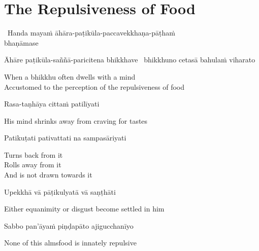 \suttaRef{[MN 2]}


\section{The Repulsiveness of Food}
\label{repulsiveness-of-food}

\begin{leader}
  \anglebracketleft\ \hspace{-0.5mm}Handa mayaṁ āhāra-paṭikūla-paccavekkhaṇa-pāṭhaṁ\\ bhaṇāmase \hspace{-0.5mm}\anglebracketright\
\end{leader}

\begin{pali-hang}
  Āhāre paṭikūla-saññā-paricitena bhikkhave \breathmark\ bhikkhuno cetasā bahulaṁ viharato
\end{pali-hang}

\begin{english}
  When a bhikkhu often dwells with a mind\\
  Accustomed to the perception of the repulsiveness of food
\end{english}

Rasa-taṇhāya cittaṁ patilīyati

\begin{english}
  His mind shrinks away from craving for tastes
\end{english}

Patikuṭati pativattati na sampasāriyati

\begin{english-verses}
  Turns back from it\\
  Rolls away from it\\
  And is not drawn towards it
\end{english-verses}

Upekkhā vā pāṭikulyatā vā saṇṭhāti

\begin{english}
  Either equanimity or disgust become settled in him
\end{english}

\suttaRef{[AN 7.49]}

Sabbo pan'āyaṁ piṇḍapāto ajigucchanīyo

\begin{english}
  None of this almsfood is innately repulsive
\end{english}

